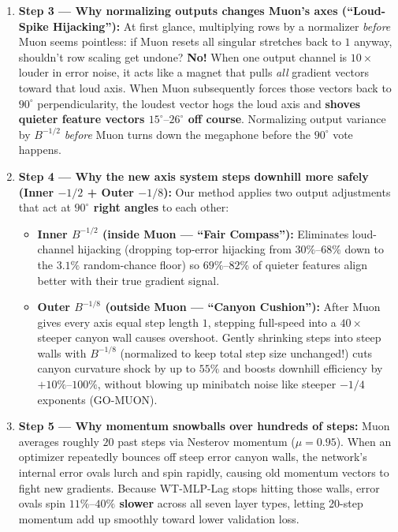 \documentclass[11pt]{article}
\newcommand{\mname}[1]{#1}
\begin{document}
\begin{enumerate}[leftmargin=1.65em, itemsep=4pt, topsep=4pt]
  \item \textbf{Step 3 --- Why normalizing outputs changes \mname{Muon}'s axes (``Loud-Spike Hijacking''):}
  At first glance, multiplying rows by a normalizer \emph{before} \mname{Muon} seems pointless: if \mname{Muon} resets all singular stretches back to $1$ anyway, shouldn't row scaling get undone?
  \textbf{No!} When one output channel is $10\times$ louder in error noise, it acts like a magnet that pulls \emph{all} gradient vectors toward that loud axis.
  When \mname{Muon} subsequently forces those vectors back to $90^\circ$ perpendicularity, the loudest vector hogs the loud axis and \textbf{shoves quieter feature vectors $15^\circ\text{--}26^\circ$ off course}.
  Normalizing output variance by $B^{-1/2}$ \emph{before} \mname{Muon} turns down the megaphone before the $90^\circ$ vote happens.

  \item \textbf{Step 4 --- Why the new axis system steps downhill more safely (Inner $-1/2$ + Outer $-1/8$):}
  Our method applies two output adjustments that act at \textbf{$90^\circ$ right angles} to each other:
  \begin{itemize}[leftmargin=1.4em, itemsep=1.5pt, topsep=2pt]
    \item \textbf{Inner $B^{-1/2}$ (inside \mname{Muon} --- ``Fair Compass''):} Eliminates loud-channel hijacking (dropping top-error hijacking from $30\%\text{--}68\%$ down to the $3.1\%$ random-chance floor) so $69\%\text{--}82\%$ of quieter features align better with their true gradient signal.
    \item \textbf{Outer $B^{-1/8}$ (outside \mname{Muon} --- ``Canyon Cushion''):} After \mname{Muon} gives every axis equal step length $1$, stepping full-speed into a $40\times$ steeper canyon wall causes overshoot. Gently shrinking steps into steep walls with $B^{-1/8}$ (normalized to keep total step size unchanged!) cuts canyon curvature shock by up to $55\%$ and boosts downhill efficiency by $+10\%\text{--}100\%$, without blowing up minibatch noise like steeper $-1/4$ exponents (\mname{GO-MUON}).
  \end{itemize}

  \item \textbf{Step 5 --- Why momentum snowballs over hundreds of steps:}
  \mname{Muon} averages roughly $20$ past steps via Nesterov momentum ($\mu = 0.95$).
  When an optimizer repeatedly bounces off steep error canyon walls, the network's internal error ovals lurch and spin rapidly, causing old momentum vectors to fight new gradients.
  Because \mname{WT-MLP-Lag} stops hitting those walls, error ovals spin \textbf{$11\%\text{--}40\%$ slower} across all seven layer types, letting 20-step momentum add up smoothly toward lower validation loss.
\end{enumerate}
\end{document}
